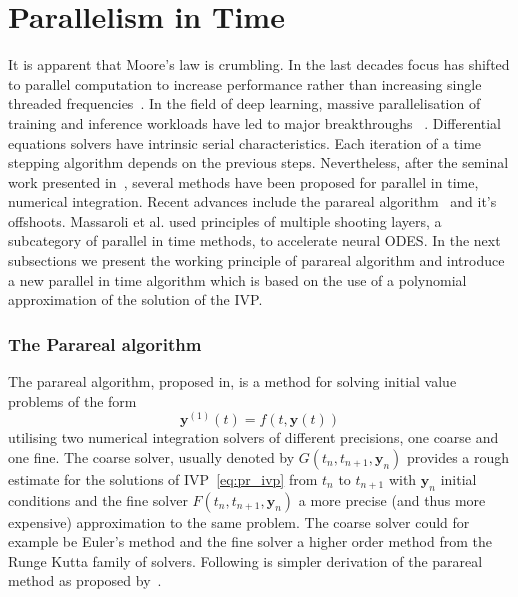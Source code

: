 \documentclass[11pt]{report}
\begin{document}
    \chapter{Parallelism in Time}
    It is apparent that Moore's law is crumbling.
    In the last decades focus has shifted to parallel computation to increase performance rather than increasing single
    threaded frequencies~\cite{theis2017end}.
    In the field of deep learning, massive parallelisation of training and inference workloads have led to major
    breakthroughs ~\cite{vaswani2017attention}.
    Differential equations solvers have intrinsic serial characteristics.
    Each iteration of a time stepping algorithm depends on the previous steps.
    Nevertheless, after the seminal work presented in~\cite{nievergelt1964parallel}, several methods have been proposed
    for parallel in time, numerical integration.
    Recent advances include the parareal algorithm~\cite{maday2002parareal} and it's offshoots.
    Massaroli et al. \cite{massaroli2021differentiable} used principles of multiple shooting layers,
    a subcategory of parallel in time methods, to accelerate neural ODES.
    In the next subsections we present the working principle of parareal algorithm and introduce a new parallel in
    time algorithm which is based on the use of a polynomial approximation of the solution of the IVP.

    \subsection{The Parareal algorithm}
    The parareal algorithm, proposed in\cite{maday2002parareal}, is a method for solving initial value problems of the form
    \begin{equation}
        \label{eq:pr_ivp}
        \pmb{y}^{(1)}(t) = f(t, \pmb{y}(t))
    \end{equation}
    utilising two numerical integration solvers of different precisions, one coarse and one fine.
    The coarse solver, usually denoted by $G(t_n, t_{n+1}, \pmb{y}_n)$ provides a rough estimate for the solutions of IVP~\eqref{eq:pr_ivp}
    from $t_n$ to $t_{n+1}$ with $\pmb{y}_n$ initial conditions and the fine solver $F(t_n, t_{n+1}, \pmb{y}_n)$ a more
    precise (and thus more expensive) approximation to the same problem.
    The coarse solver could for example be Euler's method and the fine solver a higher order method from the
    Runge Kutta family of solvers.
    Following is simpler derivation of the parareal method as proposed by~\cite{baffico2002parallel}.
\end{document}
